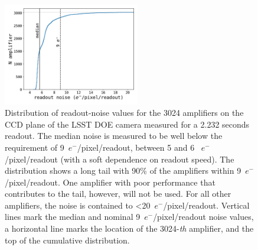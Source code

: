 \documentclass[PST,authoryear,toc]{lsstdoc}
\begin{document}
\FloatBarrier
\begin{figure}[!ht]
\centering
\includegraphics[width=0.53\textwidth]{figures/ampnoise.pdf}
\caption{Distribution of readout-noise values for the 3024 amplifiers on the CCD plane of the LSST DOE camera measured for a 2.232 seconds readout. The median noise is measured to be well below the requirement of 9~$e^-$/pixel/readout, between 5 and 6 ~$e^-$/pixel/readout (with a soft dependence on readout speed). The distribution shows a long tail with 90\% of the amplifiers within 9~$e^-$/pixel/readout. One amplifier with poor performance that contributes to the tail, however, will not be used. For all other amplifiers, the noise is contained to <20~$e^-$/pixel/readout. Vertical lines mark the median and nominal 9~$e^-$/pixel/readout noise values, a horizontal line marks the location of the 3024-{\it th} amplifier, and the top of the cumulative distribution.}\label{fig:rndist}
\end{figure}


\FloatBarrier
 \FloatBarrier
\end{document}
